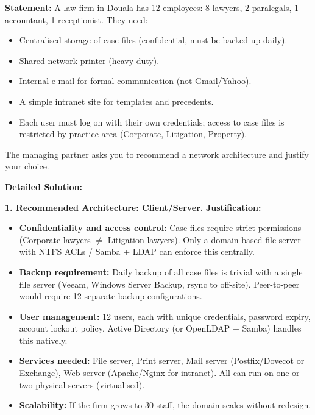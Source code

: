 \documentclass[11pt]{article}
\begin{document}
\begin{exoresolu}
\textbf{Statement:} A law firm in Douala has 12 employees: 8 lawyers, 2 paralegals, 1 accountant, 1 receptionist. They need:
\begin{itemize}
\item Centralised storage of case files (confidential, must be backed up daily).
\item Shared network printer (heavy duty).
\item Internal e-mail for formal communication (not Gmail/Yahoo).
\item A simple intranet site for templates and precedents.
\item Each user must log on with their own credentials; access to case files is restricted by practice area (Corporate, Litigation, Property).
\end{itemize}
The managing partner asks you to recommend a network architecture and justify your choice.

\textbf{Detailed Solution:}

\textbf{1. Recommended Architecture: Client/Server.}
\textbf{Justification:}
\begin{itemize}
\item \textbf{Confidentiality and access control:} Case files require strict permissions (Corporate lawyers $\neq$ Litigation lawyers). Only a domain-based file server with NTFS ACLs / Samba + LDAP can enforce this centrally.
\item \textbf{Backup requirement:} Daily backup of all case files is trivial with a single file server (Veeam, Windows Server Backup, rsync to off-site). Peer-to-peer would require 12 separate backup configurations.
\item \textbf{User management:} 12 users, each with unique credentials, password expiry, account lockout policy. Active Directory (or OpenLDAP + Samba) handles this natively.
\item \textbf{Services needed:} File server, Print server, Mail server (Postfix/Dovecot or Exchange), Web server (Apache/Nginx for intranet). All can run on one or two physical servers (virtualised).
\item \textbf{Scalability:} If the firm grows to 30 staff, the domain scales without redesign.
\end{itemize}


\end{exoresolu}
\end{document}
